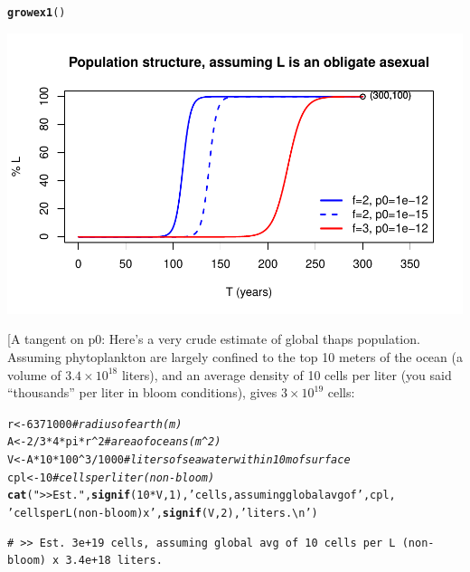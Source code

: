 \documentclass{article}\usepackage[]{graphicx}\usepackage[]{color}
\makeatletter
\def\maxwidth{ %
  \ifdim\Gin@nat@width>\linewidth
    \linewidth
  \else
    \Gin@nat@width
  \fi
}
\newcommand{\hlnum}[1]{\textcolor[rgb]{0.686,0.059,0.569}{#1}}%
\newcommand{\hlstr}[1]{\textcolor[rgb]{0.192,0.494,0.8}{#1}}%
\newcommand{\hlcom}[1]{\textcolor[rgb]{0.678,0.584,0.686}{\textit{#1}}}%
\newcommand{\hlopt}[1]{\textcolor[rgb]{0,0,0}{#1}}%
\newcommand{\hlstd}[1]{\textcolor[rgb]{0.345,0.345,0.345}{#1}}%
\newcommand{\hlkwb}[1]{\textcolor[rgb]{0.69,0.353,0.396}{#1}}%
\newcommand{\hlkwd}[1]{\textcolor[rgb]{0.737,0.353,0.396}{\textbf{#1}}}%
\newenvironment{kframe}{%
 \def\at@end@of@kframe{}%
 \ifinner\ifhmode%
  \def\at@end@of@kframe{\end{minipage}}%
  \begin{minipage}{\columnwidth}%
 \fi\fi%
 \def\FrameCommand##1{\hskip\@totalleftmargin \hskip-\fboxsep
 \colorbox{shadecolor}{##1}\hskip-\fboxsep
     \hskip-\linewidth \hskip-\@totalleftmargin \hskip\columnwidth}%
 \MakeFramed {\advance\hsize-\width
   \@totalleftmargin\z@ \linewidth\hsize
   \@setminipage}}%
 {\par\unskip\endMakeFramed%
 \at@end@of@kframe}
\newenvironment{knitrout}{}{} %
\makeatother
\begin{document}
\begin{knitrout}\footnotesize
{}\color{fgcolor}\begin{kframe}
\begin{alltt}
\hlkwd{growex1}\hlstd{()}
\end{alltt}
\end{kframe}

{\centering \includegraphics[width=\maxwidth]{asex-figs-knitr/asex-is-exponential-1} 

}



\end{knitrout}

[A tangent on p0: Here's a very crude estimate of global thaps population.  Assuming phytoplankton
are largely confined to the top 10 meters of the ocean (a volume of $3.4 \times 10^{18}$ liters),
and an average density of 10 cells per liter (you said ``thousands'' per liter in bloom conditions),
gives $3\times10^{19}$ cells:

\begin{knitrout}\footnotesize
{}\color{fgcolor}\begin{kframe}
\begin{alltt}
\hlstd{r}   \hlkwb{<-} \hlnum{6371000}              \hlcom{# radius of earth (m)}
\hlstd{A}   \hlkwb{<-} \hlnum{2}\hlopt{/}\hlnum{3}\hlopt{*}\hlnum{4}\hlopt{*}\hlstd{pi}\hlopt{*}\hlstd{r}\hlopt{^}\hlnum{2}         \hlcom{# area of oceans (m^2)}
\hlstd{V}   \hlkwb{<-} \hlstd{A} \hlopt{*} \hlnum{10} \hlopt{*} \hlnum{100}\hlopt{^}\hlnum{3}\hlopt{/}\hlnum{1000}  \hlcom{# liters of sea water within 10m of surface}
\hlstd{cpl} \hlkwb{<-} \hlnum{10}                   \hlcom{# cells per liter (non-bloom)}
\hlkwd{cat}\hlstd{(}\hlstr{">> Est."}\hlstd{,} \hlkwd{signif}\hlstd{(}\hlnum{10}\hlopt{*}\hlstd{V,}\hlnum{1}\hlstd{),} \hlstr{'cells, assuming global avg of'}\hlstd{, cpl,}
    \hlstr{'cells per L (non-bloom) x'}\hlstd{,} \hlkwd{signif}\hlstd{(V,}\hlnum{2}\hlstd{),} \hlstr{'liters.\textbackslash{}n'}\hlstd{)}
\end{alltt}
\begin{verbatim}
# >> Est. 3e+19 cells, assuming global avg of 10 cells per L (non-bloom) x 3.4e+18 liters.
\end{verbatim}
\end{kframe}
\end{knitrout}
\end{document}
